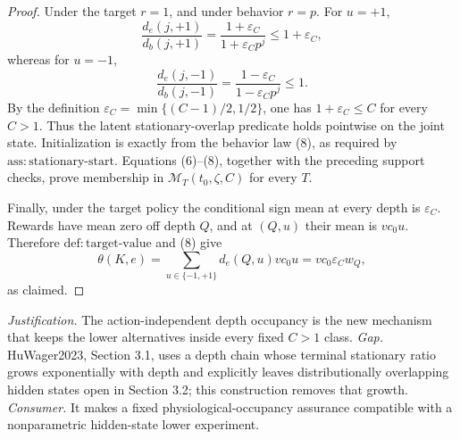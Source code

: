 \documentclass{article}
\begin{document}
\begin{proof}
Under the target \(r=1\), and under behavior \(r=p\).  For \(u=+1\),
\[
 \frac{d_e(j,+1)}{d_b(j,+1)}
 =\frac{1+\varepsilon_C}{1+\varepsilon_Cp^j}\le1+\varepsilon_C,
\]
whereas for \(u=-1\),
\[
 \frac{d_e(j,-1)}{d_b(j,-1)}
 =\frac{1-\varepsilon_C}{1-\varepsilon_Cp^j}\le1.
\]
By the definition \(\varepsilon_C=\min\{(C-1)/2,1/2\}\), one has \(1+\varepsilon_C\le C\) for every \(C>1\).  Thus the latent stationary-overlap predicate holds pointwise on the joint state.  Initialization is exactly from the behavior law (8), as required by \(\mathrm{ass{:}stationary\text{-}start}\).  Equations (6)--(8), together with the preceding support checks, prove membership in \(\mathcal M_T(t_0,\zeta,C)\) for every \(T\).

Finally, under the target policy the conditional sign mean at every depth is \(\varepsilon_C\).  Rewards have mean zero off depth \(Q\), and at \((Q,u)\) their mean is \(vc_0u\).  Therefore \(\mathrm{def{:}target\text{-}value}\) and (8) give
\[
 \theta(K,e)=\sum_{u\in\{-1,+1\}}d_e(Q,u)vc_0u
 =vc_0\varepsilon_Cw_Q,
\]
as claimed.
\end{proof}
\par\smallskip\noindent \textit{Justification.} The action-independent depth occupancy is the new mechanism that keeps the lower alternatives inside every fixed \(C>1\) class. \textit{Gap.} HuWager2023, Section 3.1, uses a depth chain whose terminal stationary ratio grows exponentially with depth and explicitly leaves distributionally overlapping hidden states open in Section 3.2; this construction removes that growth. \textit{Consumer.} It makes a fixed physiological-occupancy assurance compatible with a nonparametric hidden-state lower experiment.
\end{document}
